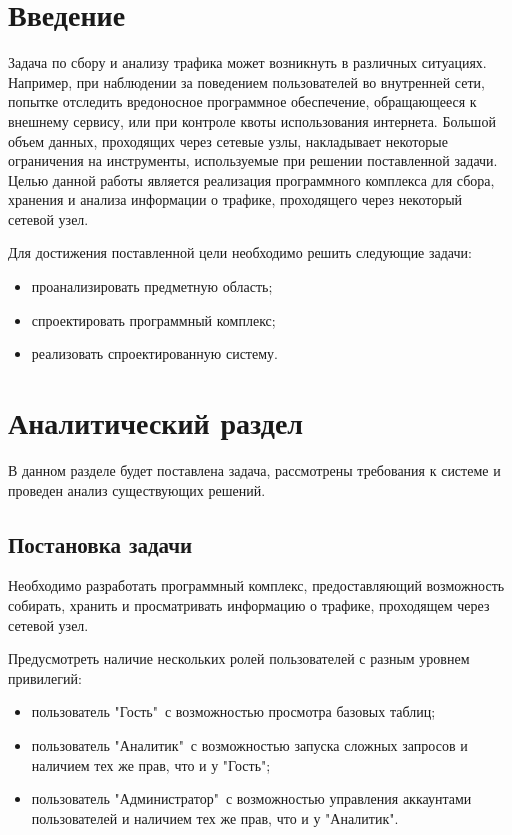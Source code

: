 
\usepackage{enumitem}
\usepackage{indentfirst}
\usepackage{gensymb}
\usepackage{enumerate}
\usepackage{float}


\graphicspath{{images/}}


\setcounter{page}{3}

\clearpage
\tableofcontents

\clearpage
\section*{Введение}
Задача по сбору и анализу трафика может возникнуть в различных ситуациях. Например, при наблюдении за поведением пользователей во внутренней сети, попытке отследить вредоносное программное обеспечение, обращающееся к внешнему сервису, или при контроле квоты использования интернета. Большой объем данных, проходящих через сетевые узлы, накладывает некоторые ограничения на инструменты, используемые при решении поставленной задачи.
	\\ \indent Целью данной работы является реализация программного комплекса для сбора, хранения и анализа информации о трафике, проходящего через некоторый сетевой узел.

Для достижения поставленной цели необходимо решить следующие задачи:
\begin{itemize}
	\item проанализировать предметную область;
	\item спроектировать программный комплекс;
	\item реализовать спроектированную систему.
\end{itemize}

\clearpage
\section{Аналитический раздел}
В данном разделе будет поставлена задача, рассмотрены требования к системе и проведен анализ существующих решений.

\subsection{Постановка задачи}
Необходимо разработать программный комплекс, предоставляющий возможность собирать, хранить и просматривать информацию о трафике, проходящем через сетевой узел.

Предусмотреть наличие нескольких ролей пользователей с разным уровнем привилегий:
\begin{itemize}
	\item пользователь "Гость"\ с возможностью просмотра базовых таблиц;
	\item пользователь "Аналитик"\  с возможностью запуска сложных запросов и наличием тех же прав, что и у "Гость";
	\item пользователь "Администратор"\  с возможностью управления аккаунтами пользователей и наличием тех же прав, что и у "Аналитик".
\end{itemize}

